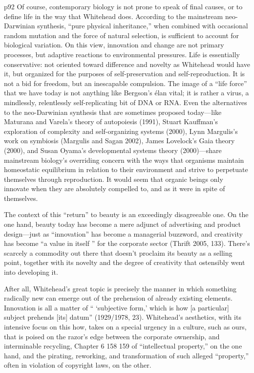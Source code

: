 \documentclass[a4paper]{Thesis}
\begin{document}
p92
Of course, contemporary biology is not prone to speak of final causes,
or to define life in the way that Whitehead does. According to the mainstream
neo-Darwinian synthesis, “pure physical inheritance,” when combined with
occasional random mutation and the force of natural selection, is sufficient to
account for biological variation. On this view, innovation and change are not
primary processes, but adaptive reactions to environmental pressures. Life is
essentially conservative: not oriented toward difference and novelty as Whitehead
would have it, but organized for the purposes of self-preservation and
self-reproduction. It is not a bid for freedom, but an inescapable compulsion.
The image of a “life force” that we have today is not anything like Bergson’s
élan vital; it is rather a virus, a mindlessly, relentlessly self-replicating bit of
DNA or RNA. Even the alternatives to the neo-Darwinian synthesis that are
sometimes proposed today—like Maturana and Varela’s theory of autopoiesis
(1991), Stuart Kauffman’s exploration of complexity and self-organizing systems
(2000), Lynn Margulis’s work on symbiosis (Margulis and Sagan 2002),
James Lovelock’s Gaia theory (2000), and Susan Oyama’s developmental systems
theory (2000)—share mainstream biology’s overriding concern with
the ways that organisms maintain homeostatic equilibrium in relation to
their environment and strive to perpetuate themselves through reproduction.
It would seem that organic beings only innovate when they are absolutely
compelled to, and as it were in spite of themselves.

The context of this “return” to beauty is an exceedingly disagreeable one. On
the one hand, beauty today has become a mere adjunct of advertising and
product design—just as “innovation” has become a managerial buzzword,
and creativity has become “a value in itself ” for the corporate sector (Thrift
2005, 133). There’s scarcely a commodity out there that doesn’t proclaim its
beauty as a selling point, together with its novelty and the degree of creativity
that ostensibly went into developing it.

After all, Whitehead’s
great topic is precisely the manner in which something radically new can
emerge out of the prehension of already existing elements. Innovation is all a
matter of “ ‘subjective form,’ which is how [a particular] subject prehends [its]
datum” (1929/1978, 23). Whitehead’s aesthetics, with its intensive focus on
this how, takes on a special urgency in a culture, such as ours, that is poised on
the razor’s edge between the corporate ownership, and interminable recycling,
Chapter 6
158 159
of “intellectual property,” on the one hand, and the pirating, reworking, and
transformation of such alleged “property,” often in violation of copyright laws,
on the other.
\end{document}
